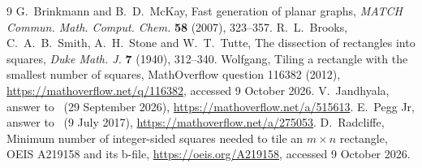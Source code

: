 \documentclass[11pt]{amsart}
\theoremstyle{remark}
\begin{document}
\begin{thebibliography}{9}
 G.~Brinkmann and B.~D.~McKay, Fast generation of planar graphs,
\emph{MATCH Commun. Math. Comput. Chem.} \textbf{58} (2007), 323--357.
 R.~L.~Brooks, C.~A.~B.~Smith, A.~H.~Stone and W.~T.~Tutte, The dissection of
rectangles into squares, \emph{Duke Math. J.} \textbf{7} (1940), 312--340.
 Wolfgang, Tiling a rectangle with the smallest number of squares, MathOverflow question
116382 (2012), \url{https://mathoverflow.net/q/116382}, accessed 9 October 2026.
 V.~Jandhyala, answer to~\cite{mo} (29 September 2026), \url{https://mathoverflow.net/a/515613}.
 E.~Pegg Jr, answer to~\cite{mo} (9 July 2017), \url{https://mathoverflow.net/a/275053}.
 D.~Radcliffe, Minimum number of integer-sided squares needed to tile an $m\times n$
rectangle, OEIS A219158 and its b-file, \url{https://oeis.org/A219158}, accessed 9 October 2026.
\end{thebibliography}
\end{document}
